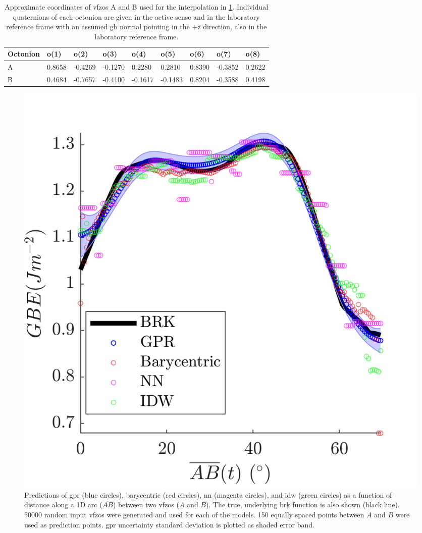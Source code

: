 \documentclass[final,twocolumn,12pt]{elsarticle}
\newcommand{\inpt}{input}
\newcommand{\outpt}{prediction}
\begin{document}
\begin{table}[]
\centering
\caption{Approximate coordinates of \glspl{vfzo} A and B used for the interpolation in \cref{fig:tunnel-50000}. Individual quaternions of each octonion are given in the active sense and in the laboratory reference frame with an assumed \gls{gb} normal pointing in the +z direction, also in the laboratory reference frame.}
\label{tab:tunnel-AB}
\begin{tabular}{@{}lllllllll@{}}
\toprule
Octonion & o(1)   & o(2)    & o(3)    & o(4)    & o(5)    & o(6)   & o(7)    & o(8)   \\ \midrule
A        & 0.8658 & -0.4269 & -0.1270 & 0.2280  & 0.2810  & 0.8390 & -0.3852 & 0.2622 \\
B        & 0.4684 & -0.7657 & -0.4100 & -0.1617 & -0.1483 & 0.8204 & -0.3588 & 0.4198 \\ \bottomrule
\end{tabular}
\end{table}
    
\begin{figure}
    \centering
    \includegraphics{figures/tunnel-50000.png}
    \caption{Predictions of \gls{gpr} (blue circles), barycentric (red circles), \gls{nn} (magenta circles), and \gls{idw} (green circles) as a function of distance along a 1D arc ($\overline{AB}$) between two \glspl{vfzo} ($A$ and $B$). The true, underlying \gls{brk} function is also shown (black line). \num{50000} random \inpt{} \glspl{vfzo} were generated and used for each of the models. \num{150} equally spaced points between $A$ and $B$ were used as \outpt{} points. \gls{gpr} uncertainty standard deviation is plotted as shaded error band.}
    \label{fig:tunnel-50000}
\end{figure}
\end{document}
